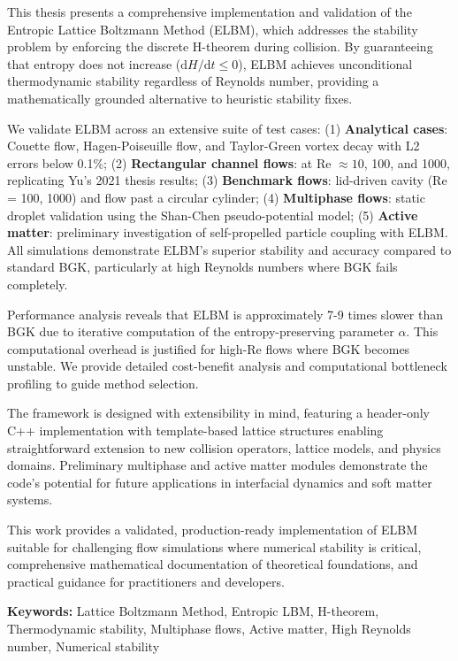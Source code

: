 \documentclass[12pt, a4paper, twoside, openright]{report}
\theoremstyle{definition}
\theoremstyle{remark}
\begin{document}
This thesis presents a comprehensive implementation and validation of the Entropic Lattice Boltzmann Method (ELBM), which addresses the stability problem by enforcing the discrete H-theorem during collision. By guaranteeing that entropy does not increase ($\mathrm{d}H/\mathrm{d}t \leq 0$), ELBM achieves unconditional thermodynamic stability regardless of Reynolds number, providing a mathematically grounded alternative to heuristic stability fixes.

We validate ELBM across an extensive suite of test cases: (1) \textbf{Analytical cases}: Couette flow, Hagen-Poiseuille flow, and Taylor-Green vortex decay with L2 errors below 0.1\%; (2) \textbf{Rectangular channel flows}: at Re $\approx 10$, 100, and 1000, replicating Yu's 2021 thesis results; (3) \textbf{Benchmark flows}: lid-driven cavity (Re = 100, 1000) and flow past a circular cylinder; (4) \textbf{Multiphase flows}: static droplet validation using the Shan-Chen pseudo-potential model; (5) \textbf{Active matter}: preliminary investigation of self-propelled particle coupling with ELBM. All simulations demonstrate ELBM's superior stability and accuracy compared to standard BGK, particularly at high Reynolds numbers where BGK fails completely.

Performance analysis reveals that ELBM is approximately 7-9 times slower than BGK due to iterative computation of the entropy-preserving parameter $\alpha$. This computational overhead is justified for high-Re flows where BGK becomes unstable. We provide detailed cost-benefit analysis and computational bottleneck profiling to guide method selection.

The framework is designed with extensibility in mind, featuring a header-only C++ implementation with template-based lattice structures enabling straightforward extension to new collision operators, lattice models, and physics domains. Preliminary multiphase and active matter modules demonstrate the code's potential for future applications in interfacial dynamics and soft matter systems.

This work provides a validated, production-ready implementation of ELBM suitable for challenging flow simulations where numerical stability is critical, comprehensive mathematical documentation of theoretical foundations, and practical guidance for practitioners and developers.

\vspace{1cm}

\noindent \textbf{Keywords:} Lattice Boltzmann Method, Entropic LBM, H-theorem, Thermodynamic stability, Multiphase flows, Active matter, High Reynolds number, Numerical stability
\end{document}

